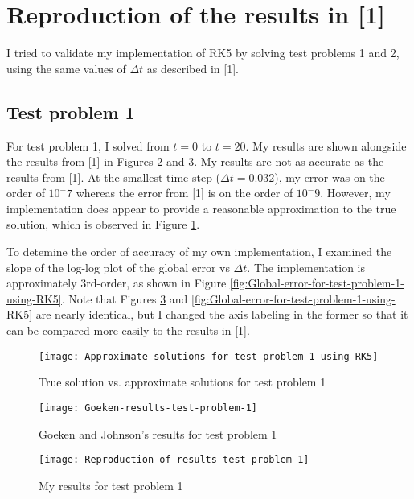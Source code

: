 \documentclass{article}
\begin{document}
\section{Reproduction of the results in [1]}
I tried to validate my implementation of RK5 by solving test problems 1 and 2, using the same values of $\Delta t$ as described in [1].
\subsection{Test problem 1}
For test problem 1, I solved from $t = 0$ to $t = 20$.  My results are shown alongside the results from [1] in Figures \ref{fig:Goeken-results-test-problem-1} and \ref{fig:Reproduction-of-results-test-problem-1}.  My results are not as accurate as the results from [1].  At the smallest time step ($\Delta t = 0.032$), my error was on the order of $10^-7$ whereas the error from [1] is on the order of $10^-9$.  However, my implementation does appear to provide a reasonable approximation to the true solution, which is observed in Figure \ref{fig:Approximate-solutions-for-test-problem-1-using-RK5}.

To detemine the order of accuracy of my own implementation, I examined the slope of the log-log plot of the global error vs $\Delta t$. The implementation is approximately 3rd-order, as shown in Figure \ref{fig:Global-error-for-test-problem-1-using-RK5}.  Note that Figures \ref{fig:Reproduction-of-results-test-problem-1} and \ref{fig:Global-error-for-test-problem-1-using-RK5} are nearly identical, but I changed the axis labeling in the former so that it can be compared more easily to the results in [1].

\begin{figure}[H]
	\centering
	\texttt{[image: Approximate-solutions-for-test-problem-1-using-RK5]}
	\caption{True solution vs. approximate solutions for test problem 1}
	\label{fig:Approximate-solutions-for-test-problem-1-using-RK5}
\end{figure}

\begin{figure}[H]
	\centering
	\texttt{[image: Goeken-results-test-problem-1]}
	\caption{Goeken and Johnson's results for test problem 1}
	\label{fig:Goeken-results-test-problem-1}
\end{figure}

\begin{figure}[H]
	\centering
	\texttt{[image: Reproduction-of-results-test-problem-1]}
	\caption{My results for test problem 1}
	\label{fig:Reproduction-of-results-test-problem-1}
\end{figure}
\end{document}
